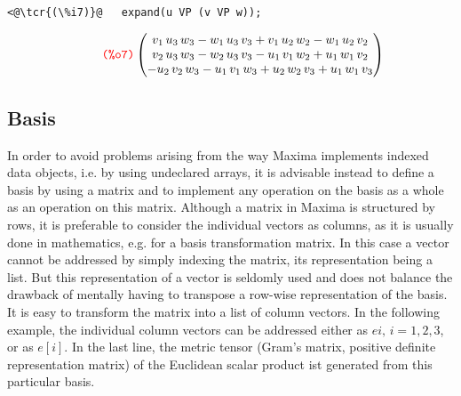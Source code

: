 \documentclass[../Maxima_Workbook.tex]{subfiles}
\begin{document}
\begin{small}
\color{blue}
\begin{lstlisting}
<@\tcr{(\%i7)}@   expand(u VP (v VP w));
\end{lstlisting}
\vspace{-4mm} \[\tag*{\tcr{\ttfamily (\%o7)}} \begin{pmatrix} v_{1}\,u_{3}\,w_{3}-w_{1}\,u_{3}\,v_{3}+v_{1}\,u_{2}\,w_{2	}-w_{1}\,u_{2}\,v_{2} \\ v_{2}\,u_{3}\,w_{3}-w_{2}\,u_{3}\,v_{3}-u_{		1}\,v_{1}\,w_{2}+u_{1}\,w_{1}\,v_{2} \\ -u_{2}\,v_{2}\,w_{3}-u_{1}\,v_{1}\,w_{3}+u_{2}\,w_{2}\,v_{3}+u_{1}\,w_{1}\,v_{3} 
\end{pmatrix} \]
\color{black}
\end{small}\vspace{-4mm}

\subsection{Basis}\label{LA10}

In order to avoid problems arising from the way Maxima implements indexed data objects, i.e. by using undeclared arrays, it is advisable instead to define a basis by using a matrix and to implement any operation on the basis as a whole as an operation on this matrix. Although a matrix in Maxima is structured by rows, it is preferable to consider the individual vectors as columns, as it is usually done in mathematics, e.g. for a basis transformation matrix. In this case a vector cannot be addressed by simply indexing the matrix, its representation being a list. But this representation of a vector is seldomly used and does not balance the drawback of mentally having to transpose a row-wise representation of the basis. It is easy to transform the matrix into a list of column vectors. In the following example, the individual column vectors can be addressed either as $ ei, \, i=1,2,3 $, or as $ e[i] $. In the last line, the metric tensor (Gram's matrix, positive definite representation matrix) of the Euclidean scalar product ist generated from this particular basis.
\end{document}
